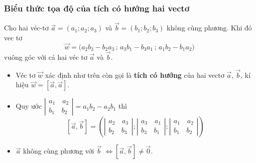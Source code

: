 \subsubsection{Biểu thức tọa độ của tích có hướng hai vectơ}
Cho hai véc-tơ $\vec{a}=(a_1;a_2;a_3)$ và $\vec{b}=(b_1;b_2;b_3)$ không cùng phương. Khi đó vec tơ $$\vec{w}=\bigg(a_2b_3-b_2a_3\,;\,a_3b_1-b_3a_1\,;\,a_1b_2-b_1a_2 \bigg)$$ vuông góc với cả hai véc tơ $\vec{a}$ và $\vec{b}$.
\begin{note}
	\begin{itemize}
		\item [\ding{172}] Véc tơ $\vec{w}$ xác định như trên còn gọi là \textbf{tích có hướng} của hai vectơ $\vec{a}$, $\vec{b}$, kí hiệu  $\vec{w}=\left[\vec{a},\vec{a}\right]$.
		\item [\ding{173}] Quy ước $\left|\begin{array}{l}
				      {a_1}\quad{a_2} \\
				      {b_1}\quad{b_2}
			      \end{array}\right|=a_1b_2-a_2b_1$ thì
		      $$\left[\vec a ,\vec b\right]=\left(\left|\begin{array}{l}
					      {a_2}\quad{a_3} \\
					      {b_2}\quad{b_3}
				      \end{array}\right|;\left|\begin{array}{l}
					      {a_3}\quad {a_1} \\
					      {b_3}\quad{b_1}
				      \end{array}\right|;\left|\begin{array}{l}
					      {a_1}\quad{a_2} \\
					      {b_1}\quad{b_2}
				      \end{array}\right|\right)$$
		\item [\ding{174}] $\vec{a}$ không cùng phương với $\vec{b}$ $\Leftrightarrow \left[\vec a ,\vec b\right] \ne \vec{0}$.
	\end{itemize}
\end{note}
